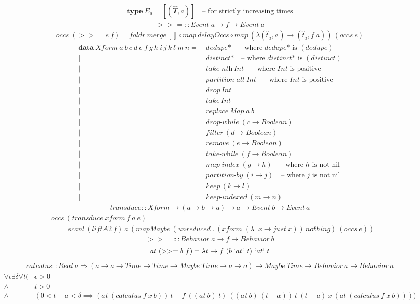 \documentclass[fleqn]{amsart}
\newcommand{\zeroarity}[1]{&\ \textit{#1*}\quad\text{-- where }\textit{#1*}\text{ is }(#1)}
\newcommand{\positive}[1]{&\ \textit{#1}\ Int\quad\text{-- where }Int\text{ is positive}}
\newcommand{\integer}[1]{&\ #1\ Int}
\newcommand{\predicate}[2]{&\ \textit{#1}\ (#2 \rightarrow Boolean)}
\newcommand{\nonnillable}[3]{&\ \textit{#1}\ (#2 \rightarrow #3)\quad\text{-- where }#3\text{ is not nil}}
\newcommand{\any}[3]{&\ \textit{#1}\ (#2 \rightarrow #3)}
\begin{document}
\begin{align*}
  \textbf{type}\ E_a = [(\hat{T}, a)]\quad\text{-- for strictly increasing times}
\end{align*}
\begin{align*}
  >>= :: Event\ a \rightarrow f \rightarrow Event\ a
\end{align*}
\begin{align*}
  occs\ (>>= e\ f) = foldr\ merge\ []\circ map\ delayOccs\circ map\ (\lambda(\hat{t}_a, a) \rightarrow (\hat{t}_a , f\ a))\ (occs\ e)
\end{align*}
\begin{align*}
  \mathbf{data}\ Xform\ a\ b\ c\ d\ e\ f\ g\ h\ i\ j\ k\ l\ m\ n =\zeroarity{dedupe}\\
  |\zeroarity{distinct}\\
  |\positive{take-nth}\\
  |\positive{partition-all}\\
  |\integer{drop}\\
  |\integer{take}\\
  |&\ replace\ Map\ a\ b\\
  |\predicate{drop-while}{c}\\
  |\predicate{filter}{d}\\
  |\predicate{remove}{e}\\
  |\predicate{take-while}{f}\\
  |\nonnillable{map-index}{g}{h}\\
  |\nonnillable{partition-by}{i}{j}\\
  |\any{keep}{k}{l}\\
  |\any{keep-indexed}{m}{n}
\end{align*}
\begin{align*}
  transduce :: Xform \rightarrow (a \rightarrow b \rightarrow a) \rightarrow a \rightarrow Event\ b \rightarrow Event\ a
\end{align*}
\begin{align*}
  &occs\ (transduce\ xform\ f\ a\ e)\\
  &\quad= scanl\ (liftA2\ f)\ a\ (mapMaybe\ (unreduced\ .\ (xform\ (\lambda\_\ x\rightarrow just\ x))\ nothing)\ (occs\ e))
\end{align*}
\begin{align*}
  >>= :: Behavior\ a \rightarrow f \rightarrow Behavior\ b
\end{align*}
\begin{align*}
  at\ (>>= b\ f) =\lambda t \rightarrow f\ (b\ `at` \ t)\ `at` \ t
\end{align*}
\begin{align*}
  calculus :: Real\ a\Rightarrow (a \rightarrow a \rightarrow Time \rightarrow Time \rightarrow Maybe\ Time \rightarrow a \rightarrow a) \rightarrow Maybe\ Time \rightarrow Behavior\ a\rightarrow Behavior\ a
\end{align*}
\begin{align*}
  \forall\epsilon\exists\delta\forall t(&\epsilon > 0\\
  \wedge& t > 0\\
  \wedge& (0 < t - a < \delta \implies(at\ (calculus\ f\ x\ b))\ t - f\ ((at\ b)\ t)\ ((at\ b)\ (t - a))\ t\ (t - a)\ x\ (at\ (calculus\ f \ x\ b))))
\end{align*}
\end{document}
